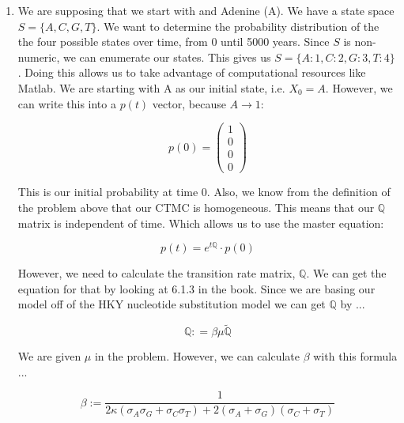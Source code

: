 \documentclass[letter,12pt]{article}
\begin{document}
\begin{enumerate}

  \item We are supposing that we start with and Adenine (A). We have a state space $S = \{A, C, G, T\}$. We want to determine the probability distribution of the 
    the four possible states over time, from 0 until 5000 years. Since $S$ is non-numeric, we can enumerate our states. This gives us $S = \{A:1, C:2, G:3, T:4\}$.
    Doing this allows us to take advantage of computational resources like Matlab. We are starting with A as our initial state, i.e. $X_0 = A$. However, we can write
    this into a $p(t)$ vector, because $A \rightarrow 1$: 

    \begin{equation}
      p(0) = \begin{pmatrix}
       1 \\
       0 \\
       0 \\
       0
      \end{pmatrix}
    \end{equation}

    This is our initial probability at time 0. Also, we know from the definition of the problem above that our CTMC is homogeneous. This means that our $\mathbb{Q}$
    matrix is independent of time. Which allows us to use the master equation:

    \begin{equation}\label{master_equation}
      p(t) = e^{t\mathbb{Q}}\cdot p(0)
    \end{equation}

    However, we need to calculate the transition rate matrix, $\mathbb{Q}$. We can get the equation for that by looking at 
    6.1.3 in the book. Since we are basing our model off of the HKY nucleotide substitution model we can get $\mathbb{Q}$ by ...

    \begin{equation}
      \mathbb{Q} : = \beta \mu \widetilde{\mathbb{Q}}
    \end{equation}

    We are given $\mu$ in the problem. However, we can calculate $\beta$ with this formula ...

    \begin{equation}
      \beta := \frac{1}{2\kappa(\sigma_A\sigma_G + \sigma_C\sigma_T) + 2(\sigma_A + \sigma_G)(\sigma_C + \sigma_T)}
    \end{equation}


\end{enumerate}
\end{document}
